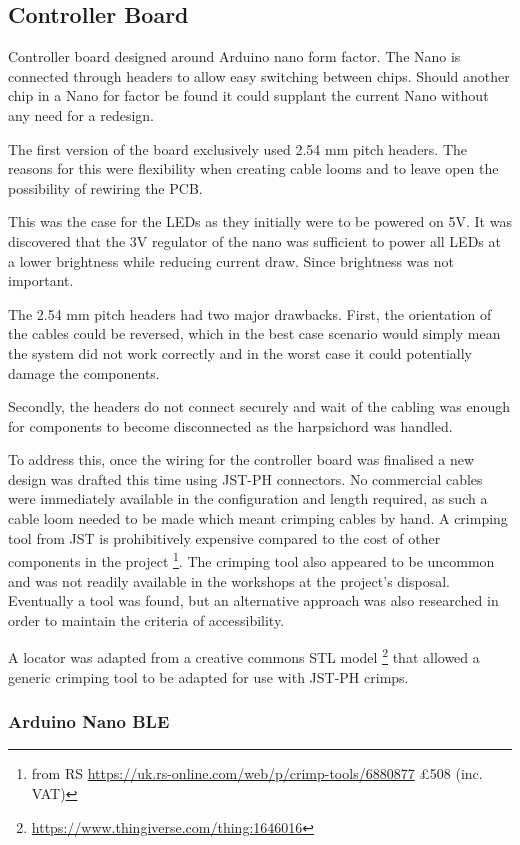 \subsection{Controller Board}\label{controller-board}

Controller board designed around Arduino nano form factor. The Nano is
connected through headers to allow easy switching between chips. Should
another chip in a Nano for factor be found it could supplant the current
Nano without any need for a redesign.

The first version of the board exclusively used 2.54 mm pitch headers.
The reasons for this were flexibility when creating cable looms and to
leave open the possibility of rewiring the PCB.

This was the case for the LEDs as they initially were to be powered on
5V. It was discovered that the 3V regulator of the nano was sufficient
to power all LEDs at a lower brightness while reducing current draw.
Since brightness was not important.

The 2.54 mm pitch headers had two major drawbacks. First, the orientation
of the cables could be reversed, which in the best case scenario would
simply mean the system did not work correctly and in the worst case it
could potentially damage the components.

Secondly, the headers do not connect securely and wait of the cabling
was enough for components to become disconnected as the harpsichord was
handled.

To address this, once the wiring for the controller board was finalised
a new design was drafted this time using JST-PH connectors. No
commercial cables were immediately available in the configuration and
length required, as such a cable loom needed to be made which meant
crimping cables by hand. A crimping tool from JST is prohibitively
expensive compared to the cost of other components in the project
\footnote{from RS \url{https://uk.rs-online.com/web/p/crimp-tools/6880877}
£508 (inc. VAT)}. The crimping tool also appeared to be uncommon and was
not readily available in the workshops at the project's disposal.
Eventually a tool was found, but an alternative approach was also
researched in order to maintain the criteria of accessibility.

A locator was adapted from a creative commons STL model \footnote{\url{https://www.thingiverse.com/thing:1646016}} that allowed a generic crimping tool to be adapted for use with JST-PH crimps. 

\subsubsection{Arduino Nano BLE}\label{arduino-nano-ble}

